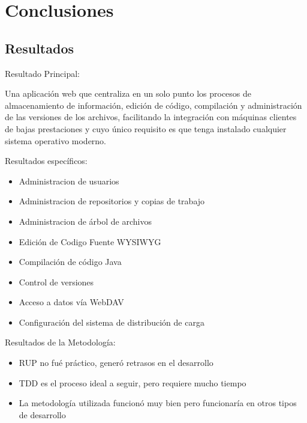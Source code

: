 \section{Conclusiones}

\subsection{Resultados}

\begin{frame}{Resultado Principal:\newline}

Una aplicación web que centraliza en un solo punto los procesos de almacenamiento de información, edición de código, compilación y administración de las versiones de los archivos, facilitando la integración con máquinas clientes de bajas prestaciones y cuyo único requisito es que tenga instalado cualquier sistema operativo moderno.

\end{frame}

\begin{frame}{Resultados específicos:\newline}

\begin{itemize}
	
	\item Administracion de usuarios
	\item Administracion de repositorios y copias de trabajo
	\item Administracion de árbol de archivos
	\item Edición de Codigo Fuente WYSIWYG
	\item Compilación de código Java
	\item Control de versiones
	\item Acceso a datos vía WebDAV
	\item Configuración del sistema de distribución de carga
	
\end{itemize}

\end{frame}


\begin{frame}{Resultados de la Metodología:\newline}

\begin{itemize}
	
	\item RUP no fué práctico, generó retrasos en el desarrollo
	\pause
	
	\item TDD es el proceso ideal a seguir, pero requiere mucho tiempo
	\pause	
	
	\item La metodología utilizada funcionó muy bien pero funcionaría en otros tipos de desarrollo
	
\end{itemize}

\end{frame}


